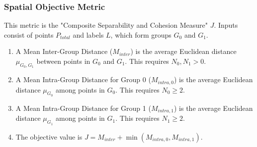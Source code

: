 \documentclass[conference]{IEEEtran}
\begin{document}
\subsubsection{Spatial Objective Metric}
This metric is the "Composite Separability and Cohesion Measure" \(J\).
Inputs consist of points \(P_{total}\) and labels \(L\), which form groups \(G_0\) and \(G_1\).
\begin{enumerate}
    \item A Mean Inter-Group Distance (\(M_{inter}\)) is the average Euclidean distance \(\mu_{G_0,G_1}\) between points in \(G_0\) and \(G_1\). This requires \(N_0, N_1 > 0\).
    \item A Mean Intra-Group Distance for Group 0 (\(M_{intra,0}\)) is the average Euclidean distance \(\mu_{G_0}\) among points in \(G_0\). This requires \(N_0 \ge 2\).
    \item A Mean Intra-Group Distance for Group 1 (\(M_{intra,1}\)) is the average Euclidean distance \(\mu_{G_1}\) among points in \(G_1\). This requires \(N_1 \ge 2\).
    \item The objective value is \(J = M_{inter} + \min(M_{intra,0}, M_{intra,1})\).
\end{enumerate}
\end{document}
